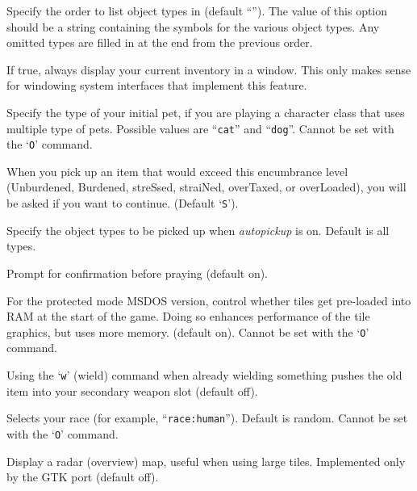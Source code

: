 \item[\ib{packorder}]
Specify the order to list object types in (default ``\Symbol{")[\%?+!=/(*`0\_}'').
The value of this option should be a string containing the
symbols for the various object types.  Any omitted types are filled in
at the end from the previous order.

\item[\ib{perm\_invent}]
If true, always display your current inventory in a window.  This only
makes sense for windowing system interfaces that implement this feature.

\item[\ib{pettype}]
Specify the type of your initial pet, if you are playing a character class
that uses multiple type of pets.  Possible values are ``{\tt cat}'' and ``{\tt dog}''.
Cannot be set with the `{\tt O}' command.

\item[\ib{pickup\_burden}]
When you pick up an item that would exceed this encumbrance
level (Unburdened, Burdened, streSsed, straiNed, overTaxed,
or overLoaded), you will be asked if you want to continue.
(Default `{\tt S}').

\item[\ib{pickup\_types}]
Specify the object types to be picked up when
{\it autopickup\/} 
is on.  Default is all types.

\item[\ib{prayconfirm}]
Prompt for confirmation before praying (default on).

\item[\ib{preload\_tiles}]
For the protected mode MSDOS version, control whether tiles
get pre-loaded into RAM at the start of the game.  Doing so
enhances performance of the tile graphics, but uses more memory. (default on).
Cannot be set with the `{\tt O}' command.

\item[\ib{pushweapon}]
Using the `{\tt w}' (wield) command when already wielding
something pushes the old item into your secondary weapon slot (default off).

\item[\ib{race}]
Selects your race (for example, ``{\tt race:human}'').  Default is random.
Cannot be set with the `{\tt O}' command.

\item[\ib{radar}]
Display a radar (overview) map, useful when using large tiles. Implemented
only by the GTK port (default off).

